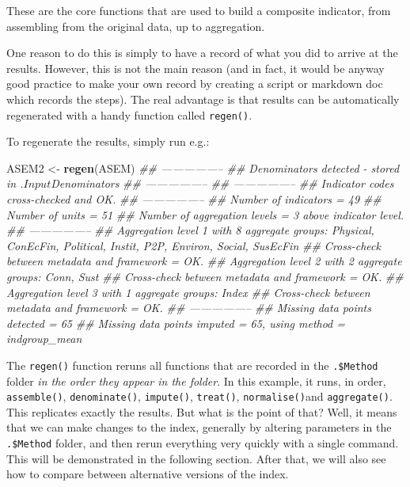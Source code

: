 \documentclass[
]{book}
\newenvironment{Shaded}{\begin{snugshade}}{\end{snugshade}}
\newcommand{\CommentTok}[1]{\textcolor[rgb]{0.56,0.35,0.01}{\textit{#1}}}
\newcommand{\KeywordTok}[1]{\textcolor[rgb]{0.13,0.29,0.53}{\textbf{#1}}}
\newcommand{\NormalTok}[1]{#1}
\newcommand{\StringTok}[1]{\textcolor[rgb]{0.31,0.60,0.02}{#1}}
\begin{document}
These are the core functions that are used to build a composite indicator, from assembling from the original data, up to aggregation.

One reason to do this is simply to have a record of what you did to arrive at the results. However, this is not the main reason (and in fact, it would be anyway good practice to make your own record by creating a script or markdown doc which records the steps). The real advantage is that results can be automatically regenerated with a handy function called \texttt{regen()}.

To regenerate the results, simply run e.g.:

\begin{Shaded}
\begin{Highlighting}[]
\NormalTok{ASEM2 <-}\StringTok{ }\KeywordTok{regen}\NormalTok{(ASEM)}
\CommentTok{## -----------------}
\CommentTok{## Denominators detected - stored in .$Input$Denominators}
\CommentTok{## -----------------}
\CommentTok{## -----------------}
\CommentTok{## Indicator codes cross-checked and OK.}
\CommentTok{## -----------------}
\CommentTok{## Number of indicators = 49}
\CommentTok{## Number of units = 51}
\CommentTok{## Number of aggregation levels = 3 above indicator level.}
\CommentTok{## -----------------}
\CommentTok{## Aggregation level 1 with 8 aggregate groups: Physical, ConEcFin, Political, Instit, P2P, Environ, Social, SusEcFin}
\CommentTok{## Cross-check between metadata and framework = OK.}
\CommentTok{## Aggregation level 2 with 2 aggregate groups: Conn, Sust}
\CommentTok{## Cross-check between metadata and framework = OK.}
\CommentTok{## Aggregation level 3 with 1 aggregate groups: Index}
\CommentTok{## Cross-check between metadata and framework = OK.}
\CommentTok{## -----------------}
\CommentTok{## Missing data points detected = 65}
\CommentTok{## Missing data points imputed = 65, using method = indgroup_mean}
\end{Highlighting}
\end{Shaded}

The \texttt{regen()} function reruns all functions that are recorded in the \texttt{.\$Method} folder \emph{in the order they appear in the folder}. In this example, it runs, in order, \texttt{assemble()}, \texttt{denominate()}, \texttt{impute()}, \texttt{treat()}, \texttt{normalise()}and \texttt{aggregate()}. This replicates exactly the results. But what is the point of that? Well, it means that we can make changes to the index, generally by altering parameters in the \texttt{.\$Method} folder, and then rerun everything very quickly with a single command. This will be demonstrated in the following section. After that, we will also see how to compare between alternative versions of the index.
\end{document}
